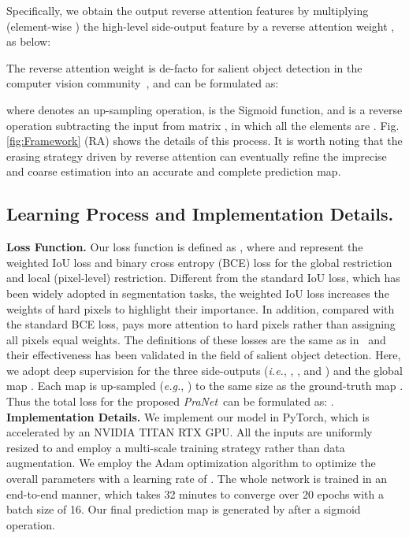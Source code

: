 \documentclass[runningheads]{llncs}
\newcommand{\figref}[1]{Fig. \ref{#1}}
\def\ie{\emph{i.e.}}
\def\eg{\emph{e.g.}}
\def\ourmodel{\textit{PraNet}}
\begin{document}
Specifically, we obtain the output reverse attention features  by multiplying  (element-wise ) the high-level side-output feature  by a reverse attention weight , as below:

The reverse attention weight  is de-facto for salient object detection in the computer vision community~\cite{chen2018reverse,zhang2020bilateral}, and can be formulated as:

where  denotes an up-sampling operation,  is the Sigmoid function, and  is a reverse operation subtracting the input from matrix , in which all the elements are . 
\figref{fig:Framework} (RA) shows the details of this process.
It is worth noting that the erasing strategy driven by reverse attention can eventually refine the imprecise and coarse estimation into an accurate and complete prediction map. 

\subsection{Learning Process and Implementation Details.}

\noindent\textbf{Loss Function.} Our loss function is defined as , where  and  represent the weighted IoU loss and binary cross entropy (BCE) loss for the global restriction and local (pixel-level) restriction. Different from the standard IoU loss, which has been widely adopted in segmentation tasks, the weighted IoU loss increases the weights of hard pixels 
to highlight their importance. In addition, compared with the standard BCE loss,  pays more attention to hard pixels rather than assigning all pixels equal weights. The definitions of these losses are the same as in~\cite{qin2019basnet,wei2019f3net} and their effectiveness has been validated in the field of salient object detection. Here, we adopt deep supervision for the three side-outputs (\ie, , , and ) and the global map . Each map is up-sampled (\eg, ) to the same size as the ground-truth map . Thus the total loss for the proposed \ourmodel~can be formulated as:
. \\

\noindent\textbf{Implementation Details.}
We implement our model in PyTorch, which is accelerated by an NVIDIA TITAN RTX GPU. All the inputs are uniformly resized to  and employ a multi-scale training strategy  rather than data augmentation. We employ the Adam optimization algorithm to optimize the overall parameters with a learning rate of . The whole network is trained in an end-to-end manner, which takes 32 minutes to converge  over 20 epochs with a batch size of 16. Our final prediction map  is generated by  after a sigmoid operation.
\end{document}
